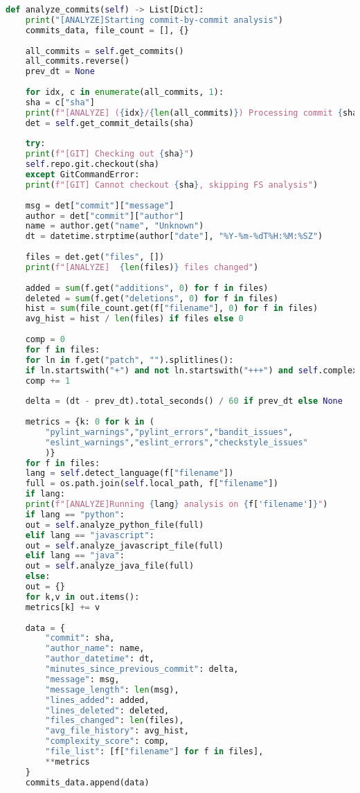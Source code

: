 \begin{lstlisting}[language=Python, caption={{ \texttt{repository\_analysis.py}}}]
	def analyze_commits(self) -> List[Dict]:
	print("[ANALYZE]Starting commit-by-commit analysis")
	commits_data, file_count = [], {}
	
	all_commits = self.get_commits()
	all_commits.reverse()
	prev_dt = None
	
	for idx, c in enumerate(all_commits, 1):
	sha = c["sha"]
	print(f"[ANALYZE] ({idx}/{len(all_commits)}) Processing commit {sha}")
	det = self.get_commit_details(sha)
	
	try:
	print(f"[GIT] Checking out {sha}")
	self.repo.git.checkout(sha)
	except GitCommandError:
	print(f"[GIT] Cannot checkout {sha}, skipping FS analysis")
	
	msg = det["commit"]["message"]
	author = det["commit"]["author"]
	name = author.get("name", "Unknown")
	dt = datetime.strptime(author["date"], "%Y-%m-%dT%H:%M:%SZ")
	
	files = det.get("files", [])
	print(f"[ANALYZE]  {len(files)} files changed")
	
	added = sum(f.get("additions", 0) for f in files)
	deleted = sum(f.get("deletions", 0) for f in files)
	hist = sum(file_count.get(f["filename"], 0) for f in files)
	avg_hist = hist / len(files) if files else 0
	
	comp = 0
	for f in files:
	for ln in f.get("patch", "").splitlines():
	if ln.startswith("+") and not ln.startswith("+++") and self.complexity_re.search(ln):
	comp += 1
	
	delta = (dt - prev_dt).total_seconds() / 60 if prev_dt else None
	
	metrics = {k: 0 for k in (
		"pylint_warnings","pylint_errors","bandit_issues",
		"eslint_warnings","eslint_errors","checkstyle_issues"
		)}
	for f in files:
	lang = self.detect_language(f["filename"])
	full = os.path.join(self.local_path, f["filename"])
	if lang:
	print(f"[ANALYZE]Running {lang} analysis on {f['filename']}")
	if lang == "python":
	out = self.analyze_python_file(full)
	elif lang == "javascript":
	out = self.analyze_javascript_file(full)
	elif lang == "java":
	out = self.analyze_java_file(full)
	else:
	out = {}
	for k,v in out.items():
	metrics[k] += v
	
	data = {
		"commit": sha,
		"author_name": name,
		"author_datetime": dt,
		"minutes_since_previous_commit": delta,
		"message": msg,
		"message_length": len(msg),
		"lines_added": added,
		"lines_deleted": deleted,
		"files_changed": len(files),
		"avg_file_history": avg_hist,
		"complexity_score": comp,
		"file_list": [f["filename"] for f in files],
		**metrics
	}
	commits_data.append(data)
	

\end{lstlisting}
